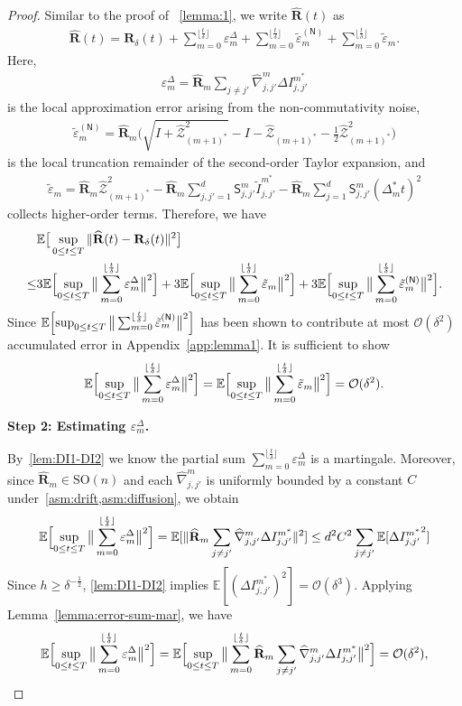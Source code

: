 \documentclass[11pt, a4paper, onecolumn]{article}
\newcommand{\SOn}{\mathrm{SO}(n)}
\newcommand{\E}{\mathbb{E}}
\renewcommand{\SS}{\mathsf{S}}
\newcommand{\m}{m}
\newcommand{\bfR}{\mathbf{R}}
\newcommand{\Z}{\mathcal{Z}}
\newcommand{\hatZ}{\widehat{\Z}}
\newcommand{\hatR}{\widehat{\bfR}}
\newcommand{\nm}[1]{\mathsf{#1}}
\newcommand{\calO}{\mathcal{O}}
\newcommand{\ms}{{m^*}}
\newcommand{\mos}{{(m+1)^*}}
\newcommand{\Dms}{{\Delta^{*}_{m}}}
\newcommand{\hnjjpms}{ {\widehat{\nabla}_{j,j'}^{\m}} }
\newcommand{\tIjjpms}{ { \tilde I_{j,j'}^{\ms}} }
\newcommand{\DIjjpms}{\Delta{I_{j,j'}^{\ms}}}
\newcommand{\sumub}{{\lfloor \frac{t}{\delta} \rfloor}}
\newcommand{\hZmos}{ \hatZ_{\mos} }
\newcommand{\thalf}{{\tfrac{1}{2}}}
\newcommand{\hRms}{{\hatR_\m}}
\newcommand{\epprm}{\tilde\varepsilon_m}
\newcommand{\epprmn}[1]{\tilde\varepsilon_m^{(#1)}}
\newcommand{\EsupN}[1]{\E\Bigl[ \sup_{0 \le t\le T} \big\| \sum_{m=0}^{\sumub} #1 \big\|^2 \Bigr]}
\begin{document}
\begin{appendices}
\begin{proof}
Similar to the proof of ~\cref{lemma:1}, we write $\hatR(t)$ as
\begin{align*}
     \hatR(t) =  \bfR_\delta(t) +  \sum_{m=0}^{\sumub}\varepsilon^{\Delta}_{m} +  \sum_{m=0}^{\sumub} \epprmn{\nm N}+ \sum_{m=0}^{\sumub} \epprm.
\end{align*}
Here,
\begin{align*}
     \varepsilon^{\Delta}_{m}
     = \hRms \sum_{j \neq j'} \hnjjpms \DIjjpms
\end{align*}
is the local approximation error arising from the non-commutativity noise,
\begin{align*}
    \epprmn{\nm N}
    = \hRms\big(\sqrt{I+\hZmos^2} - I - \hZmos - \tfrac12 \hZmos^2\big)
\end{align*}
is the local truncation remainder of the second-order Taylor expansion,
and
\begin{align*}
    \epprm
    = \hRms \hZmos^2
    - \hRms \sum_{j,j'=1}^d \SS_{j,j'}^m \tIjjpms
    - \hRms \sum_{j=1}^d \SS_{j,j'}^m (\Dms t)^2
\end{align*}
collects higher-order terms. Therefore, we have
\begin{align}\label{eq:dif-non-com}
       & \E\big[ \sup_{0 \le t\le T}\| \hatR(t)- \bfR_\delta(t) \|^2 \big]  \nonumber \\
   \le & 3\EsupN{\varepsilon^{\Delta}_{m}}    + 3\EsupN{\epprm}  + 3\EsupN{ \epprmn{\nm N}}.
\end{align}
Since $\EsupN{ \epprmn{\nm N}}$ has been shown to contribute at most $\mathcal O(\delta^{2})$ accumulated error in Appendix~\ref{app:lemma1}. It is sufficient to show
\begin{align*}
    \EsupN{\varepsilon^{\Delta}_{m}}  = \EsupN{\epprm} = \calO(\delta^2).
\end{align*}

\noindent\textbf{Step 2: Estimating $\varepsilon^{\Delta}_{m}$.}  


By~\cref{lem:DI1-DI2} we know the partial sum  $ \sum_{m=0}^{\sumub} \varepsilon^{\Delta}_{m}$ is a martingale. Moreover, since $\hRms \in \SOn$ and each $\hnjjpms$ is uniformly bounded by a constant $C$ under~\cref{asm:drift,asm:diffusion}, we obtain
\begin{align*}
     \EsupN{\varepsilon^{\Delta}_{m}} = \E[\|\hRms \sum_{j \neq j'} \hnjjpms \DIjjpms\|^2 ] \le d^2 C^2\sum_{j \neq j'}\E[\DIjjpms^2]
\end{align*}
Since $h \ge \delta^{-\thalf}$, \cref{lem:DI1-DI2} implies  $\E[(\DIjjpms)^2] = \calO(\delta^3)$. Applying Lemma~\ref{lemma:error-sum-mar}, we have
\begin{align}\label{eq:err-DI}
      \EsupN{\varepsilon^{\Delta}_{m}} = \EsupN{\hRms \sum_{j \neq j'} \hnjjpms \DIjjpms } = \calO(\delta^2),
\end{align}


\end{proof}
\end{appendices}
\end{document}

